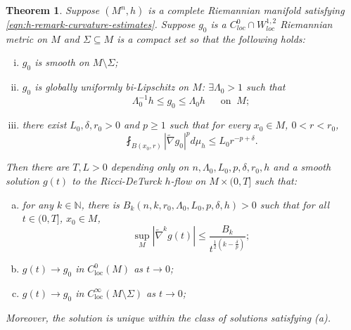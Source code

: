 \documentclass[12pt]{amsart}
\theoremstyle{plain}
\newtheorem{theorem}[subsection]{Theorem}
\theoremstyle{plain}
\theoremstyle{definition}
\theoremstyle{remark}
\numberwithin{equation}{subsection}
\newcommand{\hdel}{\tilde{\nabla}}
\begin{document}
\begin{theorem}\label{thm:intro-application-1-statement}
    Suppose $(M^n, h)$ is a complete Riemannian manifold satisfying \eqref{eqn:h-remark-curvature-estimates}. Suppose $g_0$ is a $C^0_{loc}\cap W^{1,2}_{loc}$ Riemannian metric on $M$ and $\Sigma \subseteq M$ is a compact set so that the following holds:
    \begin{enumerate}[(i)]
        \item $g_0$ is smooth on $M \setminus \Sigma$;
        \item $g_0$ is globally uniformly bi-Lipschitz on $M$: 
         $\exists\Lambda_0 > 1$ such that $$\Lambda_0^{-1} h \leq g_0 \leq \Lambda_0 h\;\;\quad\text{on}\;\;M;$$
        \item there exist $L_0,\delta,r_0 > 0$ and $p\geq 1$ such that for every $x_0 \in M$, $0 < r < r_0$,
        \begin{equation*}
            \fint_{B(x_0,r)} |\hdel g_0|^p d\mu_h \leq L_0 r^{-p+\delta}.
        \end{equation*}
    \end{enumerate}
    Then there are $T,L>0$ depending only on  $n, \Lambda_0, L_0, p, \delta, r_0,h$ and a smooth solution $g(t)$ to the Ricci-DeTurck $h$-flow on $M\times(0,T]$ such that:
        \begin{enumerate}[(a)]
            \item for any $k \in \mathbb{N}$, there is $B_k(n, k,r_0, \Lambda_0, L_0, p, \delta,h) > 0$ such that for all $t \in (0, T]$, $x_0 \in M$,
            \begin{equation*}
                \sup\limits_{M}|\hdel^k g(t)| \leq \frac{B_k}{t^{\frac{1}{2}(k-\frac{\delta}{p})}};
            \end{equation*}
            \item $g(t) \to g_0$ in $C_\text{loc}^0(M)$ as $t \to 0$;
            \item $g(t) \to g_0$ in $C_\text{loc}^\infty(M\setminus\Sigma)$ as $t \to 0$;
        \end{enumerate}
        Moreover, the solution is unique within the class of solutions satisfying (a).
\end{theorem}
\end{document}
